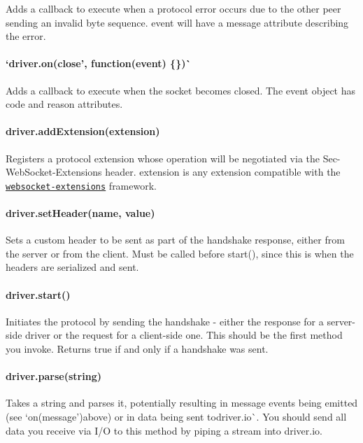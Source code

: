 Adds a callback to execute when a protocol error occurs due to the other peer sending an invalid byte sequence. {\ttfamily event} will have a {\ttfamily message} attribute describing the error.

\paragraph*{`driver.\+on(\textquotesingle{}close', function(event) \{\})\`{}}

Adds a callback to execute when the socket becomes closed. The {\ttfamily event} object has {\ttfamily code} and {\ttfamily reason} attributes.

\paragraph*{{\ttfamily driver.\+add\+Extension(extension)}}

Registers a protocol extension whose operation will be negotiated via the {\ttfamily Sec-\/\+Web\+Socket-\/\+Extensions} header. {\ttfamily extension} is any extension compatible with the \href{https://github.com/faye/websocket-extensions-node}{\tt websocket-\/extensions} framework.

\paragraph*{{\ttfamily driver.\+set\+Header(name, value)}}

Sets a custom header to be sent as part of the handshake response, either from the server or from the client. Must be called before {\ttfamily start()}, since this is when the headers are serialized and sent.

\paragraph*{{\ttfamily driver.\+start()}}

Initiates the protocol by sending the handshake -\/ either the response for a server-\/side driver or the request for a client-\/side one. This should be the first method you invoke. Returns {\ttfamily true} if and only if a handshake was sent.

\paragraph*{{\ttfamily driver.\+parse(string)}}

Takes a string and parses it, potentially resulting in message events being emitted (see `on(\textquotesingle{}message'){\ttfamily above) or in data being sent to}driver.\+io\`{}. You should send all data you receive via I/O to this method by piping a stream into {\ttfamily driver.\+io}.

